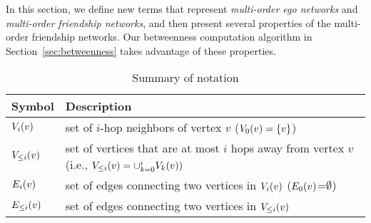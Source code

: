 In this section, we define new terms that represent {\it multi-order ego networks} and {\it multi-order
friendship networks}, and then present several properties of the multi-order friendship networks.
Our betweenness computation algorithm in Section~\ref{sec:betweenness} takes advantage of these properties.
\begin{table}[t]
\center
\caption{Summary of notation}\label{table:symbols}
\small
    \begin{tabular}{| p{1.2cm} | p{10cm} |}
        \hline
        Symbol & Description \\
        \hline
        \hline
        $\V{v}{i}$ & set of $i$-hop neighbors of vertex $v$ ($\V{v}{0} = \{ v \}$)\\
        $\LV{v}{i}$ & set of vertices that are at most $i$ hops away from vertex $v$ (i.e., $\LV{v}{i} = \cup_{k = 0}^{i} \V{v}{k}) $\\
        $\E{v}{i}$ & set of edges connecting two vertices in $\V{v}{i}$ ($\E{v}{0}$=$\emptyset$)\\
        $\LE{v}{i}$ & set of edges connecting two vertices in $\LV{v}{i}$\\
        \hline
    \end{tabular}
\end{table}


